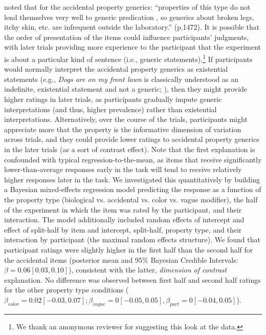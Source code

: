 \documentclass[floatsintext,doc]{apa6}
\let\rmarkdownfootnote\footnote%
\def\footnote{\protect\rmarkdownfootnote}
\begin{document}
  noted that for the accidental property generics: \enquote{properties of this type do not lend themselves very well to generic predication \cite{gelman1988development, Cimpian2008}, so generics about broken legs, itchy skin, etc. are infrequent outside the laboratory.} (p.1472). It is possible that the order of presentation of the items could influence participants' judgments, with later trials providing more experience to the participant that the experiment is about a particular kind of sentence (i.e., generic statements).\footnote{We thank an anonymous reviewer for suggesting this look at the data.} 
 If participants would normally interpret the accidental property generics as existential statements (e.g., \emph{Dogs are on my front lawn} is classically understood as an indefinite, existential statement and not a generic; ), then they might provide higher ratings in later trials, as participants gradually impute generic interpretations (and thus, higher prevalence) rather than existential interpretations.
 Alternatively, over the course of the trials, participants might appreciate more that the property is the informative dimension of variation across trials, and they could provide lower ratings to accidental property generics in the later trials (as a sort of contrast effect). 
 Note that the first explanation is confounded with typical regression-to-the-mean, as items that receive significantly lower-than-average responses early in the task will tend to receive relatively higher responses later in the task. We investigated this quantitatively by building a Bayesian mixed-effects regression model predicting the response as a function of the property type (biological vs. accidental vs. color vs. vague modifier), the half of the experiment in which the item was rated by the participant, and their interaction. The model additionally included random effects of intercept and effect of split-half by item and intercept, split-half, property type, and their interaction by participant (the maximal random effects structure). We found that participant ratings were slightly higher in the first half than the second half for the accidental items (posterior mean and 95\% Bayesian Credible Intervals: $\beta = 0.06 [0.03, 0.10]$), consistent with the latter, \emph{dimension of contrast} explanation. No difference was observed between first half and second half ratings for the other property type conditions ($\beta_{color} = 0.02 [-0.03, 0.07]; \beta_{vague} = 0 [-0.05, 0.05], \beta_{part} = 0 [-0.04, 0.05]$).
 
\end{document}
